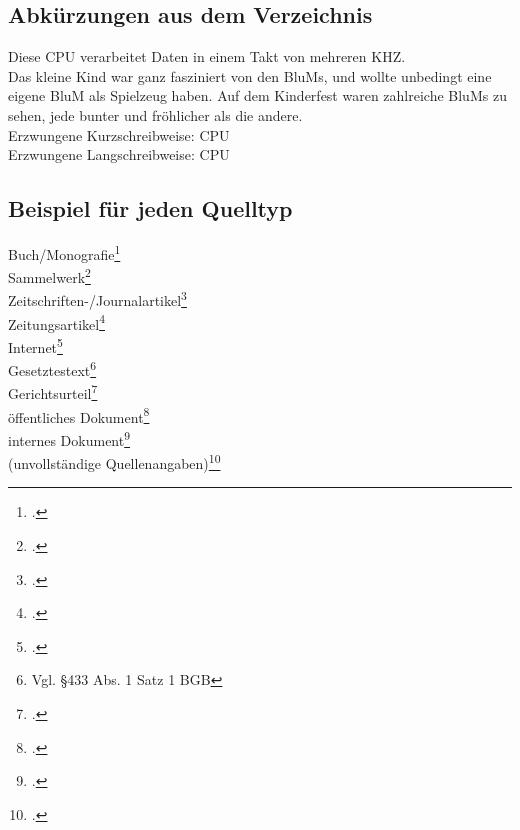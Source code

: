 \subsection{Abkürzungen aus dem Verzeichnis}

Diese \ac{CPU} verarbeitet Daten in einem Takt von mehreren \ac{KHZ}.\\
Das kleine Kind war ganz fasziniert von den \acp{BluM}, und wollte unbedingt eine eigene \ac{BluM} als Spielzeug haben. 
Auf dem Kinderfest waren zahlreiche \acp{BluM} zu sehen, jede bunter und fröhlicher als die andere.\\

Erzwungene Kurzschreibweise: \acs{CPU}\\
Erzwungene Langschreibweise: \acl{CPU}

\newpage
\subsection{Beispiel für jeden Quelltyp}

Buch/Monografie\footcite[Vgl.][]{theisen2011}\\
Sammelwerk\footcite[Vgl.][]{maier2004}\\
Zeitschriften-/Journalartikel\footcite[Vgl.][]{chodorowreich2022loan}\\
Zeitungsartikel\footcite[Vgl.][]{dick2012neugierige}\\
Internet\footcite[Vgl.][]{capital2014}\\
Gesetztestext\footnote{Vgl. §433 Abs. 1 Satz 1 BGB}\\
Gerichtsurteil\footcite[Vgl.][]{bverfgh1968}\\
öffentliches Dokument\footcite[Vgl.][]{eu2022access}\\
internes Dokument\footcite[Vgl.][]{abcorganigramm}\\%
(unvollständige Quellenangaben)\footcite[Vgl.][]{blankmaier}\\